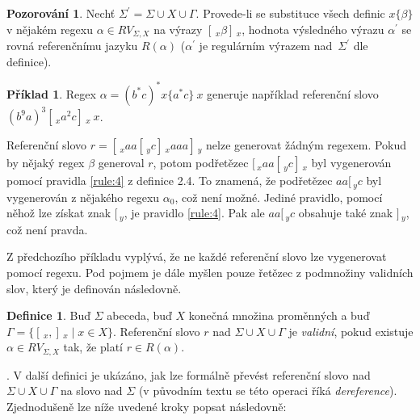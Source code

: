 \documentclass[thesis=B,czech]{FITthesis}[2019/12/23]
\theoremstyle{definition}
\newtheorem{definition}{Definice}[chapter]
\newtheorem{example}{Příklad}[chapter]
\newtheorem{pozorovani}{Pozorování}[chapter]
\begin{document}
\begin{pozorovani}\label{poz:hodnota}
Nechť $\Sigma^\prime = \Sigma \cup X \cup \Gamma$. Provede-li se substituce všech definic $x \{ \beta \}$ v nějakém regexu $\alpha \in RV_{\Sigma, X}$ na výrazy $[\,_x \beta ]\,_x$, hodnota výsledného výrazu $\alpha^\prime$ se rovná referenčnímu jazyku $R(\alpha)$ ($\alpha^\prime$ je regulárním výrazem nad~$\Sigma^\prime$ dle definice). \cite[s. 4]{fsdeter}
\end{pozorovani}

\begin{example} 
Regex $\alpha = \left( b^\ast c \right)^\ast x \{ a^\ast c \} \ x $ generuje například referenční slovo $\left(b^9a\right)^3 [\,_x a^2 c ]\,_x \ x$.

Referenční slovo $r = [\,_x aa  [\,_y c ]\,_x aaa ]\,_y$ nelze generovat žádným regexem. Pokud by nějaký regex $\beta$ generoval $r$, potom podřetězec  $[\,_x aa  [\,_y c ]\,_x$ byl vygenerován pomocí pravidla \ref{rule:4} z definice 2.4. To znamená, že podřetězec $aa  [\,_y c$  byl vygenerován z nějakého regexu $\alpha_0$, což není možné. Jediné pravidlo, pomocí něhož lze získat znak $[\,_y$, je pravidlo \ref{rule:4}. Pak ale $aa  [\,_y c$ obsahuje také znak $]\,_y$, což není pravda.
\end{example}

Z předchozího příkladu vyplývá, že ne každé referenční slovo lze vygenerovat pomocí regexu. Pod pojmem  je dále myšlen pouze řetězec z podmnožiny validních slov, který je definován následovně.

\begin{definition}
Buď $\Sigma$ abeceda, buď $X$ konečná množina proměnných a buď $\Gamma = \{ [\,_x , ]\,_x \mid x \in X \}$. Referenční slovo $r$ nad $\Sigma \cup X \cup \Gamma$  je \emph{validní}, pokud existuje $\alpha \in RV_{\Sigma, X}$ tak, že platí $r \in R\left(\alpha\right)$.
\end{definition}

. \cite{fsdeter} V další definici je ukázáno, jak lze formálně převést referenční slovo nad $\Sigma \cup X \cup \Gamma$ na slovo nad $\Sigma$ (v původním textu se této operaci říká \emph{dereference}). Zjednodušeně lze níže uvedené kroky popsat následovně:
   
\end{document}
